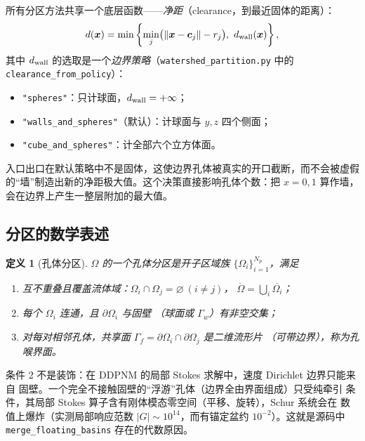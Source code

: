 \documentclass[UTF8,zihao=-4]{ctexart}
\newcommand{\cc}{\bm c}
\newtheorem{definition}{定义}[section]
\begin{document}
所有分区方法共享一个底层函数——\emph{净距}（clearance，到最近固体的距离）：
\begin{equation}\label{eq:clearance}
  d(\bm x)=\min\left\{
    \min_j\bigl(\|\bm x-\cc_j\|-r_j\bigr),\ d_{\rm wall}(\bm x)
  \right\},
\end{equation}
其中 $d_{\rm wall}$ 的选取是一个\emph{边界策略}（\texttt{watershed\_partition.py}
中的 \texttt{clearance\_from\_policy}）：
\begin{itemize}
  \item \texttt{"spheres"}：只计球面，$d_{\rm wall}=+\infty$；
  \item \texttt{"walls\_and\_spheres"}（默认）：计球面与 $y,z$ 四个侧面；
  \item \texttt{"cube\_and\_spheres"}：计全部六个立方体面。
\end{itemize}
入口出口在默认策略中不是固体，这使边界孔体被真实的开口截断，而不会被虚假
的``墙''制造出新的净距极大值。这个决策直接影响孔体个数：把 $x=0,1$ 算作墙，
会在边界上产生一整层附加的最大值。

\subsection{分区的数学表述}

\begin{definition}[孔体分区]
  $\Omega$ 的一个\emph{孔体分区}是开子区域族 $\{\Omega_i\}_{i=1}^{N_p}$，满足
  \begin{enumerate}
    \item 互不重叠且覆盖流体域：$\Omega_i\cap\Omega_j=\varnothing\ (i\ne j)$，
      $\overline\Omega=\bigcup_i\overline{\Omega_i}$；
    \item 每个 $\Omega_i$ 连通，且 $\partial\Omega_i$ 与固壁
      （球面或 $\Gamma_w$）有非空交集；
    \item 对每对相邻孔体，共享面
      $\Gamma_f=\partial\Omega_i\cap\partial\Omega_j$ 是二维流形片
      （可带边界），称为\emph{孔喉界面}。
  \end{enumerate}
\end{definition}

条件 2 不是装饰：在 DDPNM 的局部 Stokes 求解中，速度 Dirichlet 边界只能来自
固壁。一个完全不接触固壁的``浮游''孔体（边界全由界面组成）只受纯牵引
条件，其局部 Stokes 算子含有刚体模态零空间（平移、旋转），Schur 系统会在
数值上爆炸（实测局部响应范数 $|G|\sim10^{14}$，而有锚定盆约
$10^{-2}$）。这就是源码中 \texttt{merge\_floating\_basins} 存在的代数原因。
\end{document}
